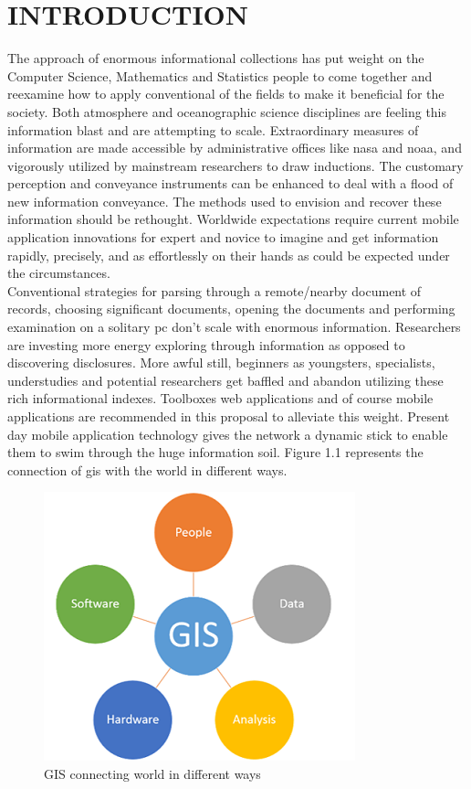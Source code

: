 \chapter{INTRODUCTION}
\label{chap:intro}


The approach of enormous informational collections has put weight on the Computer Science, Mathematics and Statistics people to come together and reexamine how to apply conventional of the fields to make it beneficial for the society. Both atmosphere and oceanographic science disciplines are feeling this information blast and are attempting to scale. Extraordinary measures of information are made accessible by administrative offices like \gls{nasa} and \gls{noaa}, and vigorously utilized by mainstream researchers to draw inductions. The customary perception and conveyance instruments can be enhanced to deal with a flood of new information conveyance. The methods used to envision and recover these information should be rethought. Worldwide expectations require current mobile application innovations for expert and novice to imagine and get information rapidly, precisely, and as effortlessly on their hands as could be expected under the circumstances. \\

Conventional strategies for parsing through a remote/nearby document of records, choosing significant documents, opening the documents and performing examination on a solitary \gls{pc} don't scale with enormous information. Researchers are investing more energy exploring through information as opposed to discovering disclosures. More awful still, beginners as youngsters, specialists, understudies and potential researchers get baffled and abandon utilizing these rich informational indexes. Toolboxes web applications and of course mobile applications are recommended in this proposal to alleviate this weight. Present day mobile application technology gives the network a dynamic stick to enable them to swim through the huge information soil. Figure 1.1 represents the connection of \gls{gis} with the world in different ways.

    \begin{figure}[H]
            \centering
            \includegraphics[width=0.50\linewidth]{figures/ch1/gis.png}
            \caption{\label{fig:gis_world} GIS connecting world in different ways \cite{CDC}}
    \end{figure}

